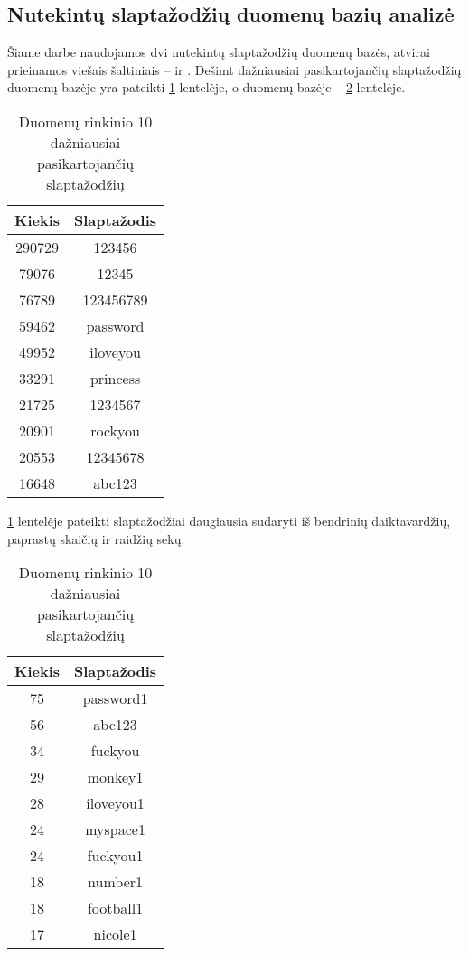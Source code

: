 \documentclass{VUMIFInfBakalaurinis}
\begin{document}
\subsection{Nutekintų slaptažodžių duomenų bazių analizė} \label{sec:db-analize}
Šiame darbe naudojamos dvi nutekintų slaptažodžių duomenų bazės, atvirai 
prieinamos viešais šaltiniais --  ir . 
Dešimt dažniausiai pasikartojančių slaptažodžių duomenų bazėje 
 yra pateikti \ref{tab:rockyou10} lentelėje, o duomenų bazėje 
 -- \ref{tab:myspace10} lentelėje.

\begin{table}[hb]
  \centering
  \begin{tabular}{|c|c|}
    \hline \textbf{Kiekis} & \textbf{Slaptažodis} \\
    \hline 290729 & 123456 \\
    \hline 79076 & 12345 \\
    \hline 76789 & 123456789 \\
    \hline 59462 & password \\
    \hline 49952 & iloveyou \\
    \hline 33291 & princess \\
    \hline 21725 & 1234567 \\
    \hline 20901 & rockyou \\
    \hline 20553 & 12345678 \\
    \hline 16648 & abc123 \\
    \hline
  \end{tabular}
  \caption{
    Duomenų rinkinio  10 dažniausiai pasikartojančių 
    slaptažodžių
  }
  \label{tab:rockyou10}
\end{table}

\ref{tab:rockyou10} lentelėje pateikti slaptažodžiai daugiausia sudaryti iš 
bendrinių daiktavardžių, paprastų skaičių ir raidžių sekų.

\begin{table}[ht]
  \centering
  \begin{tabular}{|c|c|}
    \hline \textbf{Kiekis} & \textbf{Slaptažodis} \\
    \hline 75 & password1 \\
    \hline 56 & abc123 \\
    \hline 34 & fuckyou \\
    \hline 29 & monkey1 \\
    \hline 28 & iloveyou1 \\
    \hline 24 & myspace1 \\
    \hline 24 & fuckyou1 \\
    \hline 18 & number1 \\
    \hline 18 & football1 \\
    \hline 17 & nicole1 \\
    \hline
  \end{tabular}
  \caption{
    Duomenų rinkinio  10 dažniausiai pasikartojančių 
    slaptažodžių
  }
  \label{tab:myspace10}
\end{table}
\end{document}
